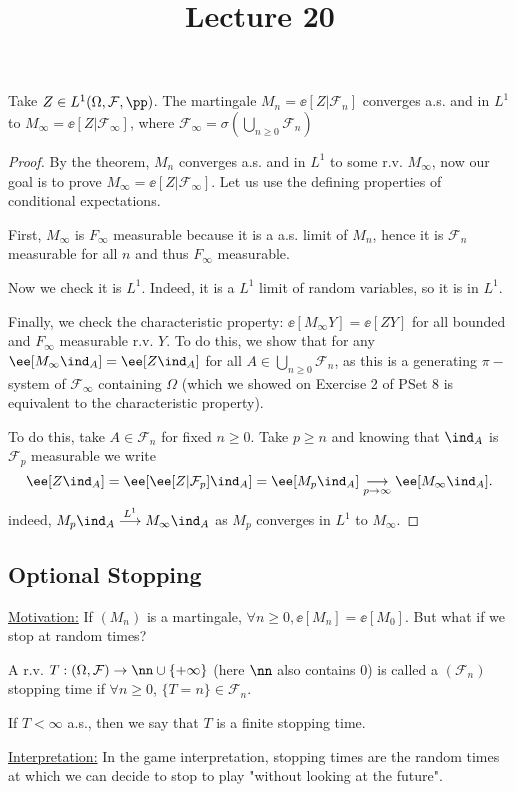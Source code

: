 \documentclass[../main.tex]{subfiles}
\title{Lecture 20}
\begin{document}
\begin{corollary}
  Take $Z \in L^1(\Omega, \mathcal{F}, \pp)$. The martingale $M_n = \ee[Z |
  \mathcal{F}_n]$ converges a.s. and in $L^1$ to $M_{\infty} = \ee[Z |
  \mathcal{F}_{\infty}]$, where $\mathcal{F}_{\infty} = \sigma(\bigcup_{n \geq
  0} \mathcal{F}_n)$
\end{corollary}
\begin{proof}
    By the theorem, $M_n$ converges a.s. and in $L^1$ to some r.v. $M_{\infty}$,
    now our goal is to prove $M_{\infty} = \ee[Z | \mathcal{F}_{\infty}]$. Let
    us use the defining properties of conditional expectations.

    First, $M_{\infty}$ is $F_{\infty}$ measurable because it is a a.s. limit of
    $M_n$, hence it is $\mathcal{F}_n$ measurable for all $n$ and thus
    $F_{\infty}$ measurable.

    Now we check it is $L^1$. Indeed, it is a $L^1$ limit of random variables,
    so it is in $L^1$.
    
    Finally, we check the characteristic property: $\ee[M_{\infty}Y] = \ee[ZY]$
    for all bounded and $F_{\infty}$ measurable r.v. $Y$. To do this, we show
    that for any $\ee[M_{\infty}\ind_A] = \ee[Z \ind_A]$ for all $A \in
    \bigcup_{n \geq 0} \mathcal{F}_n$, as this is a generating $\pi-$system of
    $\mathcal{F}_{\infty}$ containing $\Omega$ (which we showed on Exercise 2 of
    PSet 8 is equivalent to the characteristic property).

    To do this, take $A \in \mathcal{F}_n$ for fixed $n \geq 0$. Take $p \geq n$
    and knowing that $\ind_A$ is $\mathcal{F}_p$ measurable we write
    \[
      \ee[Z \ind_A] = \ee[ \ee[Z | \mathcal{F}_p] \ind_A] = \ee[M_p\ind_A]
      \underset{p \to \infty}{\longrightarrow} \ee[M_{\infty} \ind_A]
    .\] 
    indeed, $M_p \ind_A \overset{L^1}{\longrightarrow} M_{\infty}\ind_A$ as
    $M_p$ converges in $L^1$ to $M_{\infty}$.
\end{proof}

\subsection{Optional Stopping}

\underline{Motivation:} If $(M_n)$ is a martingale, $\forall n \geq 0, \ee[M_n]
= \ee[M_0]$. But what if we stop at random times?

\begin{definition}
  A r.v. $T: (\Omega, \mathcal{F}) \to \nn \cup \{ +\infty \} $ (here $\nn$ also
  contains 0) is called a $(\mathcal{F}_n)$
  stopping time if $\forall n \geq 0$, $\{ T = n \} \in \mathcal{F}_n$.

  If $T < \infty$ a.s., then we say that $T$ is a finite stopping time.
\end{definition}
\noindent
\underline{Interpretation:} In the game interpretation, stopping times are the
random times at which we can decide to stop to play "without looking at the
future".
\end{document}
